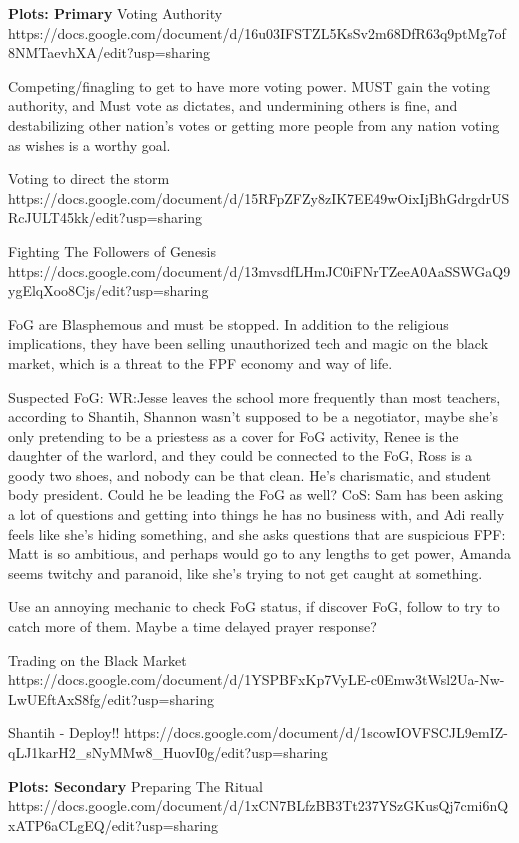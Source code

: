\documentclass[char]{GL2020}
\begin{document}
\textbf{Plots: Primary}
Voting Authority
https://docs.google.com/document/d/16u03IFSTZL5KsSv2m68DfR63q9ptMg7of8NMTaevhXA/edit?usp=sharing

Competing/finagling to get to have more voting power.  \cScholarship{} MUST gain the voting authority, and Must vote as \cAntiChup{} dictates, and undermining others is fine, and destabilizing other nation's votes or getting more people from any nation voting as \cAntiChup{} wishes is a worthy goal.

Voting to direct the storm
https://docs.google.com/document/d/15RFpZFZy8zIK7EE49wOixIjBhGdrgdrUSRcJULT45kk/edit?usp=sharing

Fighting The Followers of Genesis
https://docs.google.com/document/d/13mvsdfLHmJC0iFNrTZeeA0AaSSWGaQ9ygElqXoo8Cjs/edit?usp=sharing

FoG are Blasphemous and must be stopped.  In addition to the religious implications, they have been selling unauthorized tech and magic on the black market, which is a threat to the FPF economy and way of life.

Suspected FoG:
WR:Jesse leaves the school more frequently than most teachers, according to Shantih, Shannon wasn't supposed to be a negotiator, maybe she's only pretending to be a priestess as a cover for FoG activity, Renee is the daughter of the warlord, and they could be connected to the FoG, Ross is a goody two shoes, and nobody can be that clean.  He's charismatic, and student body president.  Could he be leading the FoG as well?
CoS: Sam has been asking a lot of questions and getting into things he has no business with, and Adi really feels like she's hiding something, and she asks questions that are suspicious
FPF: Matt is so ambitious, and perhaps would go to any lengths to get power, Amanda seems twitchy and paranoid, like she's trying to not get caught at something.

Use an annoying mechanic to check FoG status, if discover FoG, follow to try to catch more of them.  Maybe a time delayed prayer response?

Trading on the Black Market
https://docs.google.com/document/d/1YSPBFxKp7VyLE-c0Emw3tWsl2Ua-Nw-LwUEftAxS8fg/edit?usp=sharing

Shantih - Deploy!!
https://docs.google.com/document/d/1scowIOVFSCJL9emIZ-qLJ1karH2_sNyMMw8_HuovI0g/edit?usp=sharing

\textbf{Plots: Secondary}
Preparing The Ritual 
https://docs.google.com/document/d/1xCN7BLfzBB3Tt237YSzGKusQj7cmi6nQxATP6aCLgEQ/edit?usp=sharing
\end{document}
